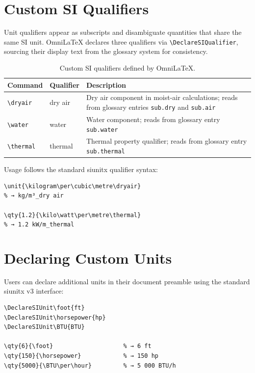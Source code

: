 \section{Custom SI Qualifiers}

Unit qualifiers appear as subscripts and disambiguate quantities that
share the same SI unit.  OmniLaTeX declares three qualifiers via
\texttt{\textbackslash DeclareSIQualifier}, sourcing their display text
from the glossary system for consistency.

\begin{table}[htbp]
  \centering
  \caption{Custom SI qualifiers defined by OmniLaTeX.}
  \label{tab:ref-si-qualifiers}
  \begin{tabular}{@{} l l p{6cm} @{}}
    \toprule
    \textbf{Command} & \textbf{Qualifier} & \textbf{Description} \\
    \midrule
    \texttt{\textbackslash dryair}
      & dry air
      & Dry air component in moist-air calculations;
        reads from glossary entries \texttt{sub.dry} and
        \texttt{sub.air} \\[4pt]
    \texttt{\textbackslash water}
      & water
      & Water component; reads from glossary entry
        \texttt{sub.water} \\[4pt]
    \texttt{\textbackslash thermal}
      & thermal
      & Thermal property qualifier; reads from glossary entry
        \texttt{sub.thermal} \\
    \bottomrule
  \end{tabular}
\end{table}

Usage follows the standard siunitx qualifier syntax:

\begin{verbatim}
\unit{\kilogram\per\cubic\metre\dryair}
% → kg/m³_dry air

\qty{1.2}{\kilo\watt\per\metre\thermal}
% → 1.2 kW/m_thermal
\end{verbatim}

\section{Declaring Custom Units}

Users can declare additional units in their document preamble using the
standard siunitx v3 interface:

\begin{verbatim}
\DeclareSIUnit\foot{ft}
\DeclareSIUnit\horsepower{hp}
\DeclareSIUnit\BTU{BTU}

\qty{6}{\foot}                    % → 6 ft
\qty{150}{\horsepower}            % → 150 hp
\qty{5000}{\BTU\per\hour}         % → 5 000 BTU/h
\end{verbatim}

